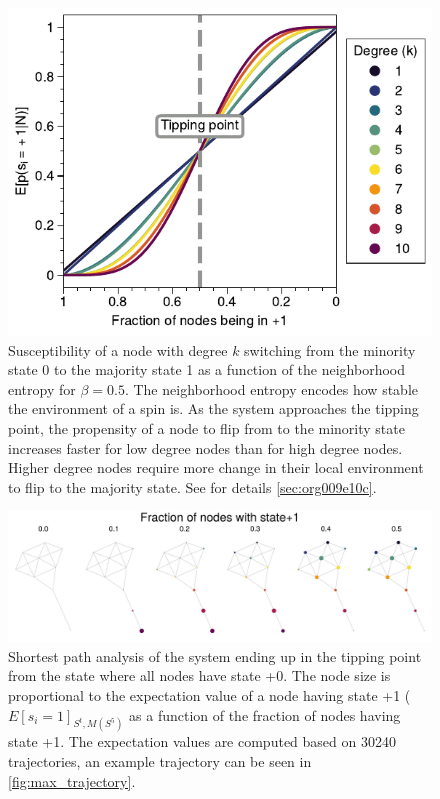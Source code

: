 \documentclass[a4paper, 11pt, twocolumn]{article}
\begin{document}
\begin{figure}[htbp]
\centering
\includegraphics[width=.9\linewidth]{./figures/fig_majority_flip.pdf}
\caption{\label{fig:maj_flip}Susceptibility of a node with degree \(k\) switching from the minority state 0 to the majority state 1 as a function of the neighborhood entropy for \(\beta = 0.5\). The neighborhood entropy encodes how stable the environment of a spin is. As the system approaches the tipping point, the propensity of a node to flip from to the minority state increases faster for low degree nodes than for high degree nodes. Higher degree nodes require more change in their local environment to flip to the majority state. See for details \ref{sec:org009e10c}.}
\end{figure}

\begin{figure}
\centering
\includegraphics[width=.9\linewidth]{./figures/expectation_kite.pdf}
\caption{\label{fig:expectation_kite}Shortest path analysis of the system ending up in the tipping point from the state where all nodes have state +0. The node size is proportional to the expectation value of a node having state +1  (\(E[s_i = 1]_{S^t, M(S^5)}\) as a function of the fraction of nodes having state +1. The expectation values are computed based on 30240 trajectories, an example trajectory can be seen in \cref{fig:max_trajectory}.}
\end{figure}
\end{document}
